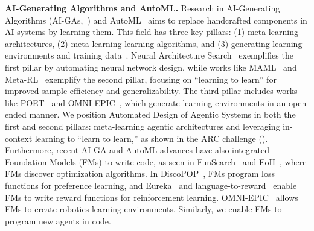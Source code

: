 \documentclass{article} %
\newcommand{\problemlong}{Automated Design of Agentic Systems\xspace}
\begin{document}
\noindent\textbf{AI-Generating Algorithms and AutoML.}\hspace{0.5em} Research in AI-Generating Algorithms (AI-GAs,~\citet{clune2019aigas}) and AutoML~\citep{hutter2019automl} aims to replace handcrafted components in AI systems by learning them. This field has three key pillars: (1) meta-learning architectures, (2) meta-learning learning algorithms, and (3) generating learning environments and training data~\citep{clune2019aigas}. Neural Architecture Search~\citep{elsken2019neural,lu2019nsga,hu2021accelerating} exemplifies the first pillar by automating neural network design, while works like MAML~\citep{finn2017maml} and Meta-RL~\citep{wang2016learning,duan2017rlsquare,norman2023first,varibad,zintgraf2021exploration} exemplify the second pillar, focusing on “learning to learn” for improved sample efficiency and generalizability. The third pillar includes works like POET~\citep{wang2019poet,dharna2022transfer,wang2020enhanced} and OMNI-EPIC~\citep{faldor2024omni}, which generate learning environments in an open-ended manner. We position \problemlong in both the first and second pillars: meta-learning agentic architectures and leveraging in-context learning to “learn to learn,” as shown in the ARC challenge (). Furthermore, recent AI-GA and AutoML advances have also integrated Foundation Models (FMs) to write code, as seen in FunSearch~\citep{romera2024funSearch} and EoH~\citep{liu2024evolution}, where FMs discover optimization algorithms. In DiscoPOP~\citep{lu2024discopop}, FMs program loss functions for preference learning, and Eureka~\citep{maeureka} and language-to-reward~\citep{yu2023language} enable FMs to write reward functions for reinforcement learning. OMNI-EPIC~\citep{faldor2024omni} allows FMs to create robotics learning environments. Similarly, we enable FMs to program new agents in code.
\end{document}
